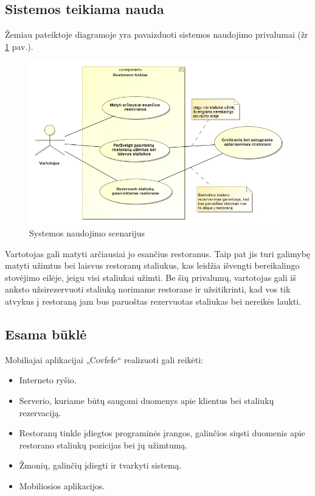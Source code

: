\documentclass{VUMIFPSkursinis}
\begin{document}
\subsection{Sistemos teikiama nauda}

Žemiau pateiktoje diagramoje yra pavaizduoti sistemos naudojimo privalumai (žr \ref{fig:systemusingbenefits} pav.).

	\begin {figure}[H]
	\centering	
		\caption{Systemos naudojimo scenarijus}
		\includegraphics[scale=0.7]{img/3lab/SystemUsingBenefits.jpg}
		
		\label{fig:systemusingbenefits}
	\end{figure}

Vartotojas gali matyti arčiausiai jo esančius restoranus. Taip pat jis turi galimybę matyti užimtus bei laisvus restoranų staliukus, kas leidžia išvengti bereikalingo stovėjimo eilėje, jeigu visi staliukai užimti. Be šių privalumų, vartotojas gali iš anksto užsirezervuoti staliuką norimame restorane ir užsitikrinti, kad vos tik atvykus į restoraną jam bus paruoštas rezervuotas staliukas bei nereikės laukti.

\subsection{Esama būklė}

Mobiliajai aplikacijai „Covfefe“ realizuoti gali reikėti:
\begin{itemize}
\item Interneto ryšio.
\item Serverio, kuriame būtų saugomi duomenys apie klientus bei staliukų rezervaciją.
\item Restoranų tinkle įdiegtos programinės įrangos, galinčios siųsti duomenis apie restorano staliukų pozicijas bei jų užimtumą.
\item Žmonių, galinčių įdiegti ir tvarkyti sistemą.
\item Mobiliosios aplikacijos.
\end{itemize}
\end{document}
